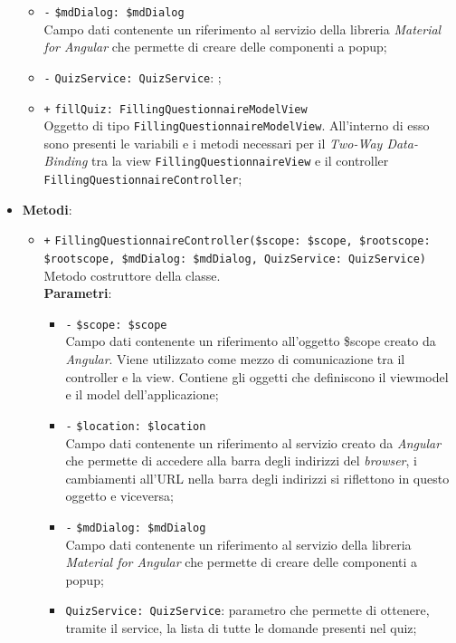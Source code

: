 \begin{itemize}
\begin{itemize}
		\item \texttt{-} \texttt{\$mdDialog: \$mdDialog} \\
		Campo dati contenente un riferimento al servizio della libreria \textit{Material for Angular} che permette di creare delle componenti a popup;
		\item \texttt{-} \texttt{QuizService: QuizService}: ;
		\item \texttt{+} \texttt{fillQuiz: FillingQuestionnaireModelView} \\
		Oggetto di tipo \texttt{FillingQuestionnaireModelView}. All'interno di esso sono presenti le variabili e i metodi necessari per il \textit{Two-Way Data-Binding} tra la view \texttt{FillingQuestionnaireView} e il controller \texttt{FillingQuestionnaireController};
	\end{itemize}
	\item \textbf{Metodi}:
	\begin{itemize}
		\item \texttt{+} \texttt{FillingQuestionnaireController(\$scope: \$scope, \$rootscope: \$rootscope, \$mdDialog: \$mdDialog, QuizService: QuizService)} \\Metodo costruttore della classe.\\
		\textbf{Parametri}:
		\begin{itemize}
			\item \texttt{-} \texttt{\$scope: \$scope} \\
			Campo dati contenente un riferimento all’oggetto \$scope creato da \textit{Angular}. Viene utilizzato come mezzo di comunicazione tra il controller e la view. Contiene gli oggetti che definiscono il viewmodel e il model dell’applicazione;
			\item \texttt{-} \texttt{\$location: \$location} \\
			Campo dati contenente un riferimento al servizio creato da \textit{Angular} che permette di accedere alla barra degli indirizzi del \textit{browser}, i cambiamenti all’URL nella barra degli indirizzi si riflettono in questo oggetto e viceversa;
			\item \texttt{-} \texttt{\$mdDialog: \$mdDialog} \\
			Campo dati contenente un riferimento al servizio della libreria \textit{Material for Angular} che permette di creare delle componenti a popup;
			\item \texttt{QuizService: QuizService}: parametro che permette di ottenere, tramite il service, la lista di tutte le domande presenti nel quiz;

\end{itemize}
\end{itemize}
\end{itemize}
